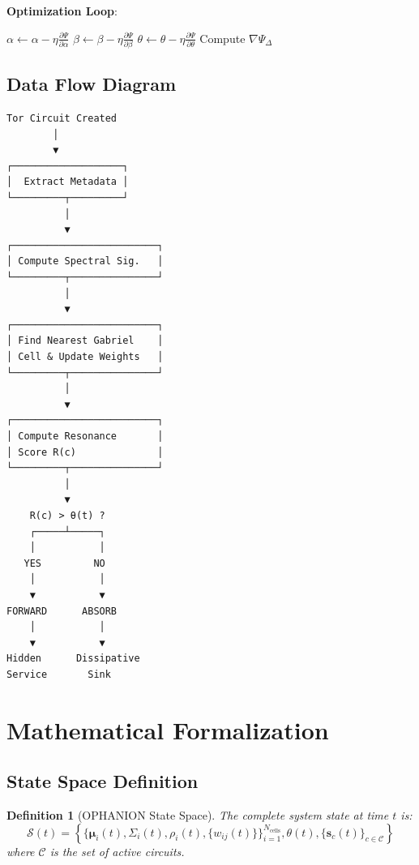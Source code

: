 \documentclass[11pt,a4paper]{article}
\newtheorem{definition}{Definition}[section]
\begin{document}
\textbf{Optimization Loop}:
\begin{algorithm}
\caption{Delta-Kernel Optimization}
\begin{algorithmic}
\WHILE{$\|\nabla \Psi_\Delta\| > \epsilon$}
    \STATE $\alpha \leftarrow \alpha - \eta \frac{\partial \Psi}{\partial \alpha}$
    \STATE $\beta \leftarrow \beta - \eta \frac{\partial \Psi}{\partial \beta}$
    \STATE $\theta \leftarrow \theta - \eta \frac{\partial \Psi}{\partial \theta}$
    \STATE Compute $\nabla \Psi_\Delta$
\ENDWHILE
\end{algorithmic}
\end{algorithm}

\subsection{Data Flow Diagram}

\begin{verbatim}
Tor Circuit Created
        │
        ▼
┌───────────────────┐
│  Extract Metadata │
└─────────┬─────────┘
          │
          ▼
┌─────────────────────────┐
│ Compute Spectral Sig.   │
└─────────┬───────────────┘
          │
          ▼
┌─────────────────────────┐
│ Find Nearest Gabriel    │
│ Cell & Update Weights   │
└─────────┬───────────────┘
          │
          ▼
┌─────────────────────────┐
│ Compute Resonance       │
│ Score R(c)              │
└─────────┬───────────────┘
          │
          ▼
    R(c) > θ(t) ?
    ┌─────┴─────┐
    │           │
   YES         NO
    │           │
    ▼           ▼
FORWARD      ABSORB
    │           │
    ▼           ▼
Hidden      Dissipative
Service       Sink
\end{verbatim}

\newpage
\section{Mathematical Formalization}

\subsection{State Space Definition}

\begin{definition}[OPHANION State Space]
The complete system state at time $t$ is:
\begin{equation}
\mathcal{S}(t) = \left\{ \{\boldsymbol{\mu}_i(t), \Sigma_i(t), \rho_i(t), \{w_{ij}(t)\}\}_{i=1}^{N_{\text{cells}}}, \theta(t), \{\mathbf{s}_c(t)\}_{c \in \mathcal{C}} \right\}
\end{equation}
where $\mathcal{C}$ is the set of active circuits.
\end{definition}
\end{document}
